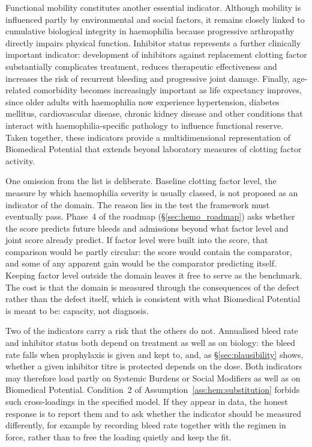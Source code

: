 Functional mobility constitutes another essential indicator. Although mobility is influenced partly by environmental and social factors, it remains closely linked to cumulative biological integrity in haemophilia because progressive arthropathy directly impairs physical function. Inhibitor status represents a further clinically important indicator: development of inhibitors against replacement clotting factor substantially complicates treatment, reduces therapeutic effectiveness and increases the risk of recurrent bleeding and progressive joint damage. Finally, age-related comorbidity becomes increasingly important as life expectancy improves, since older adults with haemophilia now experience hypertension, diabetes mellitus, cardiovascular disease, chronic kidney disease and other conditions that interact with haemophilia-specific pathology to influence functional reserve. Taken together, these indicators provide a multidimensional representation of Biomedical Potential that extends beyond laboratory measures of clotting factor activity.

One omission from the list is deliberate. Baseline clotting factor level, the measure by which haemophilia severity is usually classed, is not proposed as an indicator of the domain. The reason lies in the test the framework must eventually pass. Phase~4 of the roadmap (\S\ref{sec:hemo_roadmap}) asks whether the score predicts future bleeds and admissions beyond what factor level and joint score already predict. If factor level were built into the score, that comparison would be partly circular: the score would contain the comparator, and some of any apparent gain would be the comparator predicting itself. Keeping factor level outside the domain leaves it free to serve as the benchmark. The cost is that the domain is measured through the consequences of the defect rather than the defect itself, which is consistent with what Biomedical Potential is meant to be: capacity, not diagnosis.

Two of the indicators carry a risk that the others do not. Annualised bleed rate and inhibitor status both depend on treatment as well as on biology: the bleed rate falls when prophylaxis is given and kept to, and, as \S\ref{sec:plausibility} shows, whether a given inhibitor titre is protected depends on the dose. Both indicators may therefore load partly on Systemic Burdens or Social Modifiers as well as on Biomedical Potential. Condition~2 of Assumption~\ref{ass:hem:substitution} forbids such cross-loadings in the specified model. If they appear in data, the honest response is to report them and to ask whether the indicator should be measured differently, for example by recording bleed rate together with the regimen in force, rather than to free the loading quietly and keep the fit.

